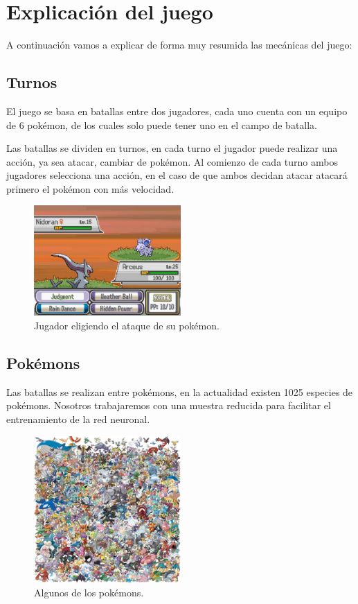 \chapter{Explicación del juego}
A continuación vamos a explicar de forma muy resumida las mecánicas del juego:

\section{Turnos}
El juego se basa en batallas entre dos jugadores, cada uno cuenta con un equipo de 6 pokémon, de los cuales solo puede tener uno en el campo de batalla. 

Las batallas se dividen en turnos, en cada turno el jugador puede realizar una acción, ya sea atacar, cambiar de pokémon. Al comienzo de cada turno ambos jugadores selecciona una acción, en el caso de que ambos decidan atacar atacará primero el pokémon con más velocidad. 

\begin{figure}[H]
        \centering
        \includegraphics[width=0.5\textwidth]{figures/combat.jpg}
        \caption{Jugador eligiendo el ataque de su pokémon.}
        \label{fig:turn}
\end{figure}

\section{Pokémons}
Las batallas se realizan entre pokémons, en la actualidad existen 1025 especies de pokémons. Nosotros trabajaremos con una muestra reducida para facilitar el entrenamiento de la red neuronal.

\begin{figure}[H]
	\centering
	\includegraphics[width=0.5\textwidth]{figures/pokemons.jpg}
	\caption{Algunos de los pokémons.}
	\label{fig:pokemon}
\end{figure}

